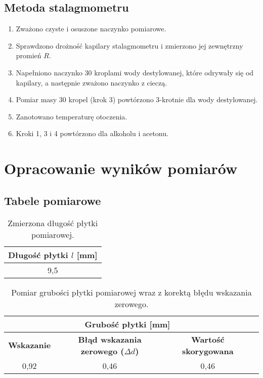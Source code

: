 \documentclass[a4paper,12pt]{article}
\begin{document}
\subsection{Metoda stalagmometru}
\begin{enumerate}
    \item Zważono czyste i osuszone naczynko pomiarowe.
    \item Sprawdzono drożność kapilary stalagmometru i zmierzono jej zewnętrzny promień $R$.
    \item Napełniono naczynko 30 kroplami wody destylowanej, które odrywały się od kapilary, a następnie zważono naczynko z cieczą.
    \item Pomiar masy 30 kropel (krok 3) powtórzono 3-krotnie dla wody destylowanej.
    \item Zanotowano temperaturę otoczenia.
    \item Kroki 1, 3 i 4 powtórzono dla alkoholu i acetonu.
\end{enumerate}

\section{Opracowanie wyników pomiarów}

\subsection{Tabele pomiarowe}


\begin{table}[H]
    \centering
    \begin{tabular}{|c|}
        \hline
        \textbf{Długość płytki $l$ [mm]} \\
        \hline
        9{,}5 \\ %
        \hline
    \end{tabular}
    \caption{Zmierzona długość płytki pomiarowej.}
    \label{tab:dlugosc_plytki}
\end{table}

\begin{table}[H]
    \centering
    \begin{tabular}{|c|c|c|c|}
        \hline
        \multicolumn{3}{|c|}{\textbf{Grubość płytki [mm]}} \\
        \hline
        \textbf{Wskazanie} & \textbf{Błąd wskazania zerowego ($\Delta d$) } & \textbf{Wartość skorygowana} \\
        \hline
        0{,}92 & 0{,}46 & 0{,}46 \\
        \hline
    \end{tabular}
    \caption{Pomiar grubości płytki pomiarowej wraz z korektą błędu wskazania zerowego.}
    \label{tab:grubosc_plytki}
\end{table}
\end{document}
